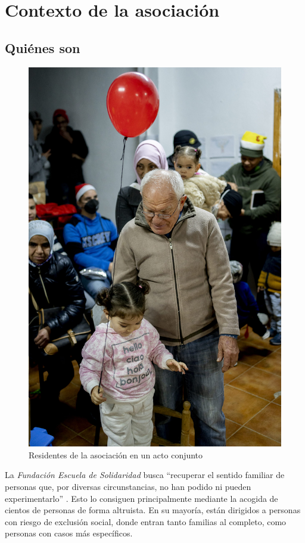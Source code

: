 \section{Contexto de la asociación}
\label{sec:asociacion}

\subsection{Quiénes son}

\begin{figure}
    \centering
    \includegraphics[width=0.9\linewidth]{imagenes/fes/gente.jpg}
    \caption{Residentes de la asociación en un acto conjunto}
\end{figure}

La \textit{Fundación Escuela de Solidaridad} busca ``recuperar el sentido familiar de personas que, por diversas circunstancias, no han podido ni pueden experimentarlo'' \cite{web-feds}. Esto lo consiguen principalmente mediante la acogida de cientos de personas de forma altruista. En su mayoría, están dirigidos a personas con riesgo de exclusión social, donde entran tanto familias al completo, como personas con casos más específicos.

